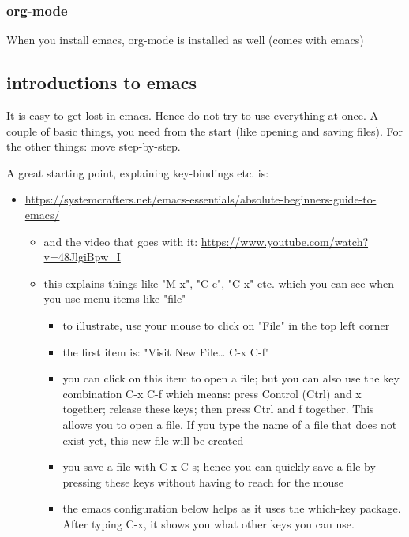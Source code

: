\documentclass[11pt]{article}
\begin{document}
\subsubsection{org-mode}
\label{sec:org9bbf7d6}

When you install emacs, org-mode is installed as well (comes with emacs)


\subsection{introductions to emacs}
\label{sec:org545ac6b}

It is easy to get lost in emacs. Hence do not try to use everything at once. A couple of basic things, you need from the start (like opening and saving files). For the other things: move step-by-step. 

A great starting point, explaining key-bindings etc. is:
\begin{itemize}
\item \url{https://systemcrafters.net/emacs-essentials/absolute-beginners-guide-to-emacs/}
\begin{itemize}
\item and the video that goes with it: \url{https://www.youtube.com/watch?v=48JlgiBpw\_I}
\item this explains things like "M-x", "C-c", "C-x" etc. which you can see when you use menu items like "file"
\begin{itemize}
\item to illustrate, use your mouse to click on "File" in the top left corner
\item the first item is: "Visit New File\ldots{} C-x C-f"
\item you can click on this item to open a file; but you can also use the key combination C-x C-f which means: press Control (Ctrl) and x together; release these keys; then press Ctrl and f together. This allows you to open a file. If you type the name of a file that does not exist yet, this new file will be created
\item you save a file with C-x C-s; hence you can quickly save a file by pressing these keys without having to reach for the mouse
\item the emacs configuration below helps as it uses the which-key package. After typing C-x, it shows you what other keys you can use.
\end{itemize}
\end{itemize}
\end{itemize}
\end{document}
